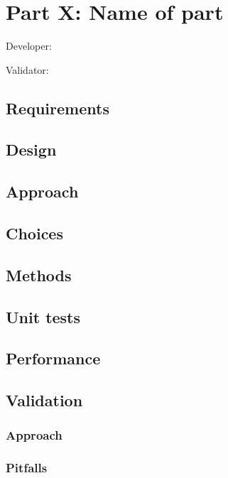 \chapter{Part X: Name of part}
Developer:

Validator: 



\section{Requirements}


\section{Design }


\section{Approach}

\section{Choices}

\section{Methods}


\section{Unit tests}


\section{Performance}




\section{Validation}


\subsection{Approach}


\subsection{Pitfalls}

